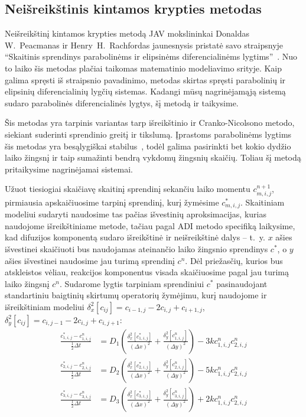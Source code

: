 \newpage
\subsection{Neišreikštinis kintamos krypties metodas}

Neišreikštinį kintamos krypties metodą JAV mokslininkai Donaldas W.~Peacmanas ir Henry~H.~Rachfordas jaunesnysis pristatė savo straipsnyje \enquote{Skaitinis sprendinys parabolinėms ir elipsinėms diferencialinėms lygtims}~\cite{doi:10.1137/0103003}. Nuo to laiko šis metodas plačiai taikomas matematinio modeliavimo srityje. Kaip galima spręsti iš straipsnio pavadinimo, metodas skirtas spręsti parabolinių ir elipsinių diferencialinių lygčių sistemas. Kadangi mūsų nagrinėjamąją sistemą sudaro parabolinės diferencialinės lygtys, šį metodą ir taikysime.

Šis metodas yra tarpinis variantas tarp išreikštinio ir Cranko-Nicolsono metodo, siekiant suderinti sprendinio greitį ir tikslumą. Įprastoms parabolinėms lygtims šis metodas yra besąlygiškai stabilus~\cite{liAlternatingDirectionImplicit2021}, todėl galima pasirinkti bet kokio dydžio laiko žingsnį ir taip sumažinti bendrą vykdomų žingsnių skaičių. Toliau šį metodą pritaikysime nagrinėjamai sistemai.

Užuot tiesiogiai skaičiavę skaitinį sprendinį sekančiu laiko momentu $c^{n+1}_{m,i,j}$, pirmiausia apskaičiuosime tarpinį sprendinį, kurį žymėsime $c^*_{m,i,j}$. Skaitiniam modeliui sudaryti naudosime tas pačias išvestinių aproksimacijas, kurias naudojome išreikštiniame metode, tačiau pagal ADI metodo specifiką laikysime, kad difuzijos komponentą sudaro išreikštinė ir neišreikštinė dalys -- \hbox{t. y.} $x$ ašies išvestinei skaičiuoti bus naudojamas ateinančio laiko žingsnio sprendinys $c^*$, o $y$ ašies išvestinei naudosime jau turimą sprendinį $c^n$. Dėl priežasčių, kurios bus atskleistos vėliau, reakcijos komponentus visada skaičiuosime pagal jau turimą laiko žingsnį $c^n$. Sudarome lygtis tarpiniam sprendiniui $c^*$ pasinaudojant standartiniu baigtinių skirtumų operatorių žymėjimu, kurį naudojome ir išreikštiniam modeliui $\delta_x^2[c_{ij}]=c_{i-1,j}-2c_{i,j}+c_{i+1,j}$, $\delta_y^2[c_{ij}]=c_{i,j-1}-2c_{i,j}+c_{i,j+1}$:
\begin{subequations} \label{eqs:adi-half-step}
\begin{align}
	\frac{c^*_{1,i,j} - c^n_{1,i,j}}{\frac{1}{2}\Delta t} &= D_1 \left( \frac{\delta_x^2[c^*_{1,i,j}]}{(\Delta x)^2} + \frac{\delta_y^2[c^n_{1,i,j}]}{(\Delta y)^2} \right) - 3kc^n_{1,i,j}c^n_{2,i,j}\\
	\frac{c^*_{2,i,j} - c^n_{2,i,j}}{\frac{1}{2}\Delta t} &= D_2 \left( \frac{\delta_x^2[c^*_{2,i,j}]}{(\Delta x)^2} + \frac{\delta_y^2[c^n_{2,i,j}]}{(\Delta y)^2} \right) - 5kc^n_{1,i,j}c^n_{2,i,j}\\
	\frac{c^*_{3,i,j} - c^n_{3,i,j}}{\frac{1}{2}\Delta t} &= D_3 \left( \frac{\delta_x^2[c^*_{3,i,j}]}{(\Delta x)^2} + \frac{\delta_y^2[c^n_{3,i,j}]}{(\Delta y)^2} \right) +2kc^n_{1,i,j}c^n_{2,i,j}
\end{align}
\end{subequations}

